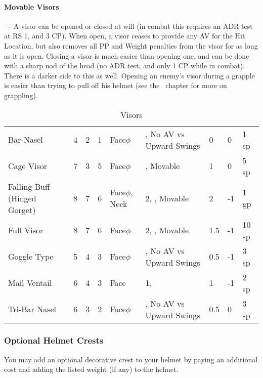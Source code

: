 \documentclass[oneside,11pt,english]{book}
\begin{document}
\paragraph{\label{par:Movable Visors}Movable Visors}---\quad
A visor can be opened or closed at will (in combat this requires an ADR test at
RS 1, and 3 CP). When open, a visor ceases to provide any AV for the Hit
Location, but also removes all PP and Weight penalties from the visor for as
long as it is open. Closing a visor is much easier than opening one, and can be
done with a sharp nod of the head (no ADR test, and only 1 CP while in combat).
There is a darker side to this as well. Opening an enemy’s visor during a
grapple is easier than trying to pull off his helmet (see the
~chapter for more on grappling). 

\begin{longtabu} to 
  \caption{Visors}
  \label{tab:Visors}\\

  Bar-Nasel& 4& 2& 1& Face\hyperref[sec:Weak Spots]{$\phi$}& , No AV vs Upward Swings &0& 0& 1 sp\\
  Cage Visor& 7& 3& 5& Face\hyperref[sec:Weak Spots]{$\phi$}& , Movable& 1& 0& 5 sp\\
  Falling Buff 
  (Hinged Gorget)& 8& 7& 6& Face\hyperref[sec:Weak Spots]{$\phi$}, Neck&  2, , 
  Movable& 2 &-1& 1 gp\\
  Full Visor& 8& 7& 6& Face\hyperref[sec:Weak Spots]{$\phi$}&  2, , 
  Movable& 1.5 &-1& 10 sp\\
  Goggle Type& 5& 4& 3& Face\hyperref[sec:Weak Spots]{$\phi$}& , No AV vs Upward Swings &0.5 &-1& 3 sp\\
  Mail Ventail& 6& 4& 3& Face&  1, & 1 &-1& 2 sp\\
  Tri-Bar Nasel& 6& 3& 2& Face\hyperref[sec:Weak Spots]{$\phi$}& , No AV vs Upward Swings &0.5& 0& 3 sp\\
\end{longtabu}

\subsubsection{Optional Helmet Crests}
You may add an optional decorative crest to your helmet by paying an additional cost and adding the listed weight (if any) to the helmet.
\end{document}
